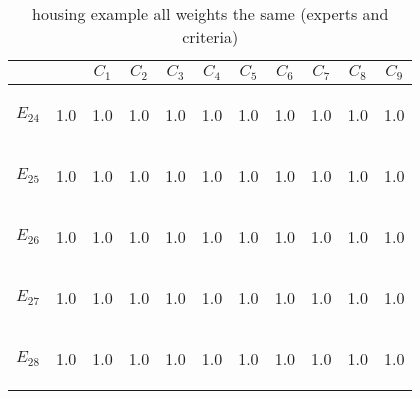 \begin{table}[htp]
\begin{center}
\begin{tabular}{|cc|c|c|c|c|c|c|c|c|c|}
\hline \hline
& & $C_1$ & $C_2$ & $C_3$ & $C_4$ & $C_5$ & $C_6$ & $C_7$ & $C_8$ & $C_9$\\ 
\hline \hline
\begin{scriptsize}$E_{24}$\end{scriptsize} & \begin{scriptsize}1.0\end{scriptsize} & 1.0 & 1.0 & 1.0 & 1.0 & 1.0 & 1.0 & 1.0 & 1.0 & 1.0\\
\begin{scriptsize}$E_{25}$\end{scriptsize} & \begin{scriptsize}1.0\end{scriptsize} & 1.0 & 1.0 & 1.0 & 1.0 & 1.0 & 1.0 & 1.0 & 1.0 & 1.0\\
\begin{scriptsize}$E_{26}$\end{scriptsize} & \begin{scriptsize}1.0\end{scriptsize} & 1.0 & 1.0 & 1.0 & 1.0 & 1.0 & 1.0 & 1.0 & 1.0 & 1.0\\
\begin{scriptsize}$E_{27}$\end{scriptsize} & \begin{scriptsize}1.0\end{scriptsize} & 1.0 & 1.0 & 1.0 & 1.0 & 1.0 & 1.0 & 1.0 & 1.0 & 1.0\\
\begin{scriptsize}$E_{28}$\end{scriptsize} & \begin{scriptsize}1.0\end{scriptsize} & 1.0 & 1.0 & 1.0 & 1.0 & 1.0 & 1.0 & 1.0 & 1.0 & 1.0\\
\hline \hline
\end{tabular}
\end{center}
\caption{housing example all weights the same (experts and criteria)}
\label{AllSame}
\end{table}